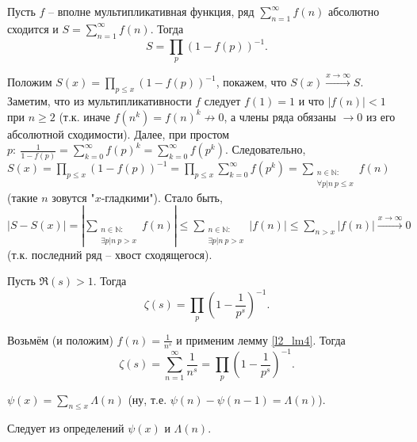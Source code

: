 
\begin{lemma} \label{l2_lm4}
	Пусть $f$ -- вполне мультипликативная функция, ряд $\displaystyle \sum\limits_{n=1}^\infty f(n)$ абсолютно сходится и $\displaystyle S = \sum\limits_{n=1}^\infty f(n)$. Тогда
	$$S = \prod\limits_p(1-f(p))^{-1}.$$
\end{lemma}
\begin{pf}
	Положим $\displaystyle S(x) = \prod\limits_{p \leq x}(1-f(p))^{-1}$, покажем, что $S(x) \xrightarrow{x\to\infty} S$. Заметим, что из мультипликативности $f$ следует $f(1) = 1$ и что $|f(n)|<1$ при $n \geq 2$ (т.к. иначе $f(n^k)=f(n)^k \not \to 0$, а члены ряда обязаны $\to 0$ из его абсолютной сходимости). Далее, при простом $\displaystyle p: \ \frac{1}{1-f(p)} = \sum\limits_{k=0}^\infty f(p)^k = \sum\limits_{k=0}^\infty f(p^k)$. Следовательно, $\displaystyle S(x) = \prod\limits_{p\leq x} (1-f(p))^{-1} = \prod\limits_{p\leq x}\sum\limits_{k=0}^\infty f(p^k) = \sum\limits_{\substack{n\in\mathbb{N}: \\ \forall p|n \ p \leq x}}f(n)$ (такие $n$ зовутся "$x$-гладкими"). Стало быть, $\displaystyle \left|S-S(x)\right|=\left|\sum\limits_{\substack{n\in\mathbb{N}: \\ \exists p|n \ p > x}}f(n)\right| \leq \sum\limits_{\substack{n\in\mathbb{N}: \\ \exists p|n \ p > x}}\left|f(n)\right| \leq \sum\limits_{n>x}\left|f(n)\right| \xrightarrow{x\to\infty} 0$ (т.к. последний ряд -- хвост сходящегося).
\end{pf}

\begin{theorem} \label{l2_Euler_formula}
	Пусть $\Re(s)>1$. Тогда $$\zeta(s) = \prod\limits_p\left( 1-\frac{1}{p^s}\right)^{-1}.$$
\end{theorem}
\begin{pf}
	Возьмём (и положим) $\displaystyle f(n) = \frac{1}{n^s}$ и применим лемму \ref{l2_lm4}. Тогда
		$$\zeta(s) = \sum\limits_{n=1}^\infty \frac{1}{n^s} = \prod\limits_p\left( 1-\frac{1}{p^s} \right)^{-1}.$$
\end{pf}

\begin{lemma} \label{l2_lm5}
	$\displaystyle \psi(x) = \sum\limits_{n \leq x} \Lambda(n)$ (ну, т.е. $\psi(n)-\psi(n-1)=\Lambda(n)$).
\end{lemma}
\begin{pf}
	Следует из определений $\psi(x)$ и $\Lambda(n)$.
\end{pf}
